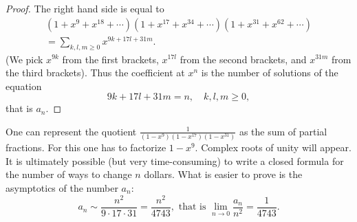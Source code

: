 \begin{proof}
The right hand side is equal to
\begin{multline*}
(1 + x^9 + x^{18} + \cdots)(1 + x^{17} + x^{34} + \cdots)(1 + x^{31} + x^{62} + \cdots)\\
= \sum_{k,l,m\ge 0} x^{9k+17l+31m}.
\end{multline*}
(We pick $x^{9k}$ from the first brackets, $x^{17l}$ from the second brackets, and $x^{31m}$ from the third brackets).
Thus the coefficient at $x^n$ is the number of solutions of the equation
\[
9k + 17l + 31m = n, \quad k, l, m \ge 0,
\]
that is $a_n$.
\end{proof}

One can represent the quotient $\frac{1}{(1-x^9)(1-x^{17})(1-x^{31})}$ as the sum of partial fractions.
For this one has to factorize $1-x^9$.
Complex roots of unity will appear.
It is ultimately possible (but very time-consuming) to write a closed formula for the number of ways to change $n$ dollars.
What is easier to prove is the asymptotics of the number $a_n$:
\[
a_n \sim \frac{n^2}{9 \cdot 17 \cdot 31} = \frac{n^2}{4743}, \text{ that is } \lim_{n \to 0} \frac{a_n}{n^2} = \frac{1}{4743}.
\]



